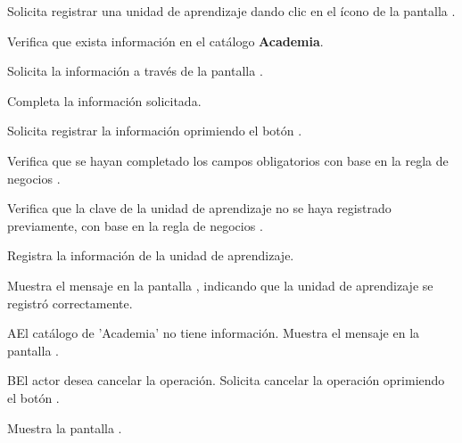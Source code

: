 \begin{UCtrayectoria}
	\UCpaso [\UCactor] Solicita registrar una unidad de aprendizaje dando clic en el ícono \btnRegistrar de la pantalla . 
	
	\UCpaso[\UCsist] Verifica que exista información en el catálogo \textbf{Academia}. 
	
	\UCpaso[\UCsist] Solicita la información a través de la pantalla .
	
	\UCpaso [\UCactor] Completa la información solicitada. \label{CUOE1.5.1:CompletaInfo}
	
	\UCpaso [\UCactor] Solicita registrar la información oprimiendo el botón . 
	
	\UCpaso [\UCsist] Verifica que se hayan completado los campos obligatorios con base en la regla de negocios . 
	
	\UCpaso [\UCsist] Verifica que la clave de la unidad de aprendizaje no se haya registrado previamente, con base en la regla de negocios . 
			
	\UCpaso [\UCsist] Registra la información de la unidad de aprendizaje.
	
	\UCpaso [\UCsist] Muestra el mensaje  en la pantalla , indicando que la unidad de aprendizaje se registró correctamente.	
	
\end{UCtrayectoria}


\begin{UCtrayectoriaA}{A}{El catálogo de 'Academia' no tiene información.}
	\UCpaso [\UCsist] Muestra el mensaje  en la pantalla . 
\end{UCtrayectoriaA}

\begin{UCtrayectoriaA}{B}{El actor desea cancelar la operación.}
	\UCpaso [\UCactor] Solicita cancelar la operación oprimiendo el botón .
	
	\UCpaso [\UCsist] Muestra la pantalla .  
\end{UCtrayectoriaA}

